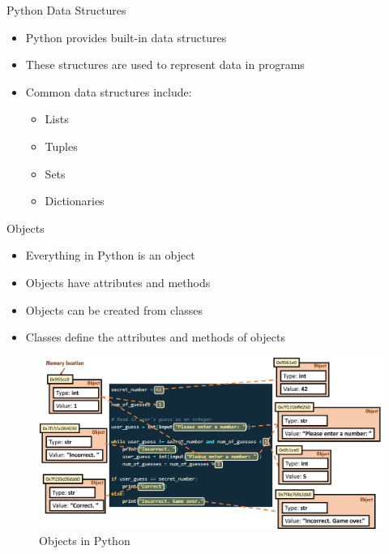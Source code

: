 \documentclass{beamer}
\begin{document}
    

\begin{frame}{Python Data Structures}
    \begin{itemize}
        \item Python provides built-in data structures
        \item These structures are used to represent data in programs
        \item Common data structures include:
        \begin{itemize}
            \item Lists
            \item Tuples
            \item Sets
            \item Dictionaries
        \end{itemize}
    \end{itemize}
\end{frame}


\begin{frame}{Objects}
    \begin{itemize}
        \item Everything in Python is an object
        \item Objects have attributes and methods
        \item Objects can be created from classes
        \item Classes define the attributes and methods of objects
    \end{itemize}
\end{frame}
\begin{frame}
    \begin{figure}
        \centering
        \includegraphics[width=1.0\textwidth]{pics/objects.png}
        \caption{Objects in Python}
    \end{figure}
\end{frame}
\end{document}

